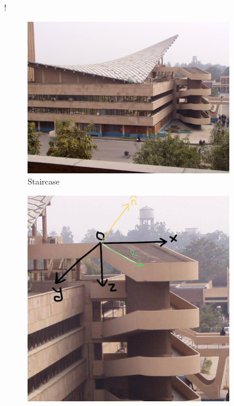 \documentclass[paper=a4, fontsize=11pt]{scrartcl} %
\begin{document}
\begin{figure}[ht]!
    \centering
        \begin{subfigure}[ht]{0.475\textwidth}
            \centering
            \includegraphics[width=\textwidth]{figures/view.jpg}
            \caption{Staircase\label{fig:staircase}}    
        \end{subfigure}
        \hfill
        \begin{subfigure}[ht]{0.475\textwidth}  
            \centering 
            \includegraphics[width=\textwidth]{figures/coordinate.jpg}

\end{subfigure}
\end{figure}
\end{document}
